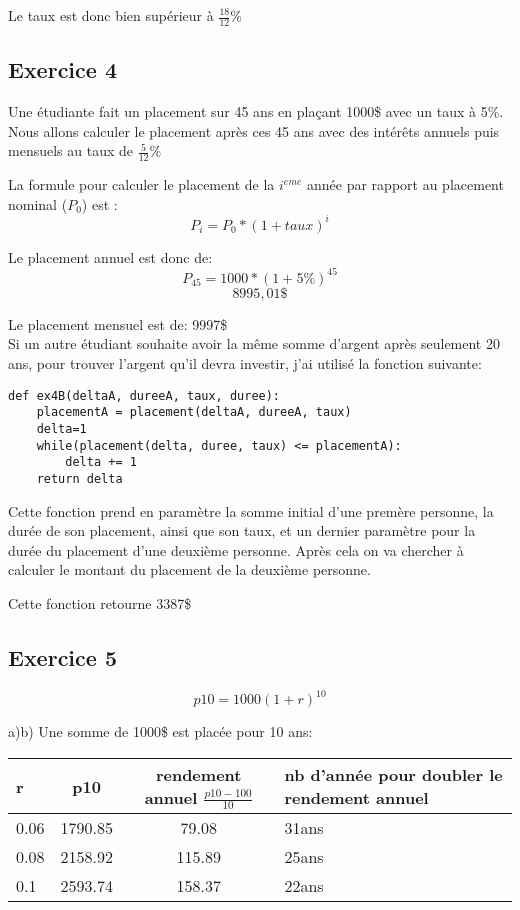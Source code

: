 \documentclass[12pt]{article}
\begin{document}
\qquad Le taux est donc bien supérieur à $\frac{18}{12}\%$

\subsection{Exercice 4}

\qquad Une étudiante fait un placement sur 45 ans en plaçant 1000\$ avec un taux à 5\%. Nous allons calculer le placement après ces 45 ans avec des intérêts annuels puis mensuels au taux de $\frac{5}{12}\%$

\qquad La formule pour calculer le placement de la $ i^{eme}$ année par rapport au placement nominal ($P_0$) est :
$$P_i = P_0 * (1+taux)^i$$

\qquad Le placement annuel est donc de:
$$P_{45} = 1000 * (1+5\%)^{45}$$
$$8995,01\$ $$

\qquad Le placement mensuel est de: 9997\$
\\

\qquad Si un autre étudiant souhaite avoir la même somme d'argent après seulement 20 ans, pour trouver l'argent qu'il devra investir, j'ai utilisé la fonction suivante:

\begin{lstlisting}
def ex4B(deltaA, dureeA, taux, duree):
    placementA = placement(deltaA, dureeA, taux)
    delta=1
    while(placement(delta, duree, taux) <= placementA):
        delta += 1
    return delta
\end{lstlisting}

\qquad Cette fonction prend en paramètre la somme initial d'une premère personne, la durée de son placement, ainsi que son taux, et un dernier paramètre pour la durée du placement d'une deuxième personne. Après cela on va chercher à calculer le montant du placement de la deuxième personne.

\qquad Cette fonction retourne 3387\$

\subsection{Exercice 5}

$$p10 = 1000(1+r)^{10}$$

a)b) Une somme de 1000\$ est placée pour 10 ans:
\begin{center}
   \begin{tabularx}{13cm}{ | l | c | c | X |}
     \hline
     r & p10 & rendement annuel $\frac{p10-100}{10}$ & nb d'année pour doubler le rendement annuel \\ 
     \hline
     0.06 & 1790.85 & 79.08 & 31ans \\ 
     \hline
     0.08 & 2158.92 & 115.89 & 25ans \\ 
     \hline
     0.1 & 2593.74 & 158.37 & 22ans \\ 
     \hline
   \end{tabularx}
 \end{center}
\end{document}
